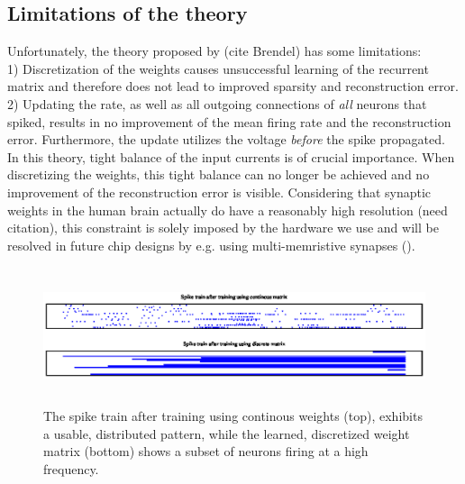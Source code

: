 \documentclass[twoside,11pt]{article}
\begin{document}
\subsection{Limitations of the theory} \label{sec:limitations}
Unfortunately, the theory proposed by (cite Brendel) has some limitations: \\
1) Discretization of the weights causes unsuccessful learning of the recurrent matrix and therefore
does not lead to improved sparsity and reconstruction error. \\
2) Updating the rate, as well as all outgoing connections of \emph{all} neurons that spiked,
results in no improvement of the mean firing rate and the reconstruction error.
Furthermore, the update utilizes the voltage \emph{before} the spike propagated. \\

In this theory, tight balance of the input
currents is of crucial importance. When discretizing the weights, this tight balance can no longer
be achieved and no improvement of the reconstruction error is visible.
Considering that synaptic weights in the human brain actually do have a reasonably high resolution (need citation),
this constraint is solely imposed by the hardware we use and will be resolved in future chip designs
by e.g. using multi-memristive synapses (\cite{Boybat2018}).

\begin{figure}[!htb]
  \includegraphics[width = \columnwidth, height=4cm]{figures/spike_train_cont_vs_disc.eps}
  \caption{The spike train after training using continous weights (top), exhibits a usable,
  distributed pattern, while the learned, discretized weight matrix (bottom) shows a subset
  of neurons firing at a high frequency.}
  \label{fig:discrete_spike_trains}
\end{figure}
\end{document}
